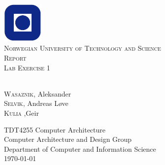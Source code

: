 \documentclass[11pt]{article}
\begin{document}
\begin{titlepage} 

\begin{center}


\includegraphics[width=0.15\textwidth]{icons/ntnu.jpg}\\[1cm]    

\textsc{Norwegian University of Technology and Science}\\[1.5cm]

\textsc{\Large Report \\Lab Exercise 1}\\[0.5cm]



\begin{minipage}{0.4\textwidth}
\begin{center}

 \large
\emph{}\\
\textsc{Wasaznik}, Aleksander \\
\textsc{Selvik}, Andreas L{\o}ve  \\
\textsc{Kulia} ,Geir 



\end{center} 

\end{minipage}


 
\begin{minipage}{0.4\textwidth}

\end{minipage}

\vfill
TDT4255 Computer Architecture \\
Computer Architecture and Design Group \\
Department of Computer and Information Science \\
{\large \today}

\end{center}
\end{titlepage}

    \newpage
\end{document}
